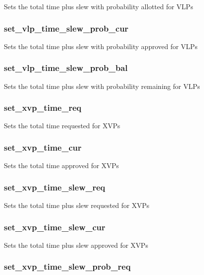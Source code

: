 \documentclass{article}
\begin{document}
Sets the total time plus slew with probability allotted for VLPs

\subsubsection*{set\_vlp\_time\_slew\_prob\_cur\label{Panel_set_vlp_time_slew_prob_cur}}


Sets the total time plus slew with probability approved for VLPs

\subsubsection*{set\_vlp\_time\_slew\_prob\_bal\label{Panel_set_vlp_time_slew_prob_bal}}


Sets the total time plus slew with probability remaining for VLPs

\subsubsection*{set\_xvp\_time\_req\label{Panel_set_xvp_time_req}}


Sets the total time requested for XVPs

\subsubsection*{set\_xvp\_time\_cur\label{Panel_set_xvp_time_cur}}


Sets the total time approved for XVPs

\subsubsection*{set\_xvp\_time\_slew\_req\label{Panel_set_xvp_time_slew_req}}


Sets the total time plus slew requested for XVPs

\subsubsection*{set\_xvp\_time\_slew\_cur\label{Panel_set_xvp_time_slew_cur}}


Sets the total time plus slew approved for XVPs

\subsubsection*{set\_xvp\_time\_slew\_prob\_req\label{Panel_set_xvp_time_slew_prob_req}}
\end{document}
